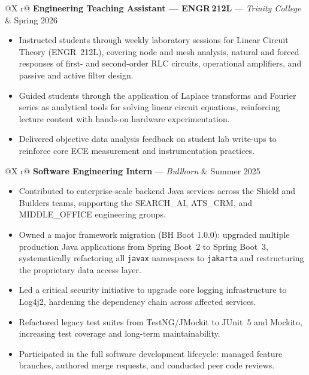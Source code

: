 \documentclass[10pt, letterpaper]{article}
\makeatletter
\newcommand{\cventry}[4]{%
  \begin{tabularx}{\linewidth}{@{}X r@{}}
    \textbf{#1} \textnormal{---} \textit{#2} & \textnormal{#4} \\
    \multicolumn{2}{@{}l@{}}{\small #3}
  \end{tabularx}\vspace{1pt}}
\makeatother
\begin{document}
\vspace{6pt}

\cventry{Engineering Teaching Assistant --- ENGR\,212L}{Trinity College}{Hartford, CT}{Spring 2026}
\begin{itemize}
  \item Instructed students through weekly laboratory sessions for Linear Circuit Theory
        (ENGR~212L), covering node and mesh analysis, natural and forced responses of first- and
        second-order RLC circuits, operational amplifiers, and passive and active filter design.
  \item Guided students through the application of Laplace transforms and Fourier series as
        analytical tools for solving linear circuit equations, reinforcing lecture content with
        hands-on hardware experimentation.
  \item Delivered objective data analysis feedback on student lab write-ups to reinforce core
        ECE measurement and instrumentation practices.
\end{itemize}

\vspace{6pt}

\cventry{Software Engineering Intern}{Bullhorn}{Boston, MA}{Summer 2025}
\begin{itemize}
  \item Contributed to enterprise-scale backend Java services across the Shield and Builders
        teams, supporting the SEARCH\_AI, ATS\_CRM, and MIDDLE\_OFFICE engineering groups.
  \item Owned a major framework migration (BH Boot 1.0.0): upgraded multiple production Java
        applications from Spring Boot~2 to Spring Boot~3, systematically refactoring all
        \texttt{javax} namespaces to \texttt{jakarta} and restructuring the proprietary data
        access layer.
  \item Led a critical security initiative to upgrade core logging infrastructure to Log4j2,
        hardening the dependency chain across affected services.
  \item Refactored legacy test suites from TestNG/JMockit to JUnit~5 and Mockito, increasing
        test coverage and long-term maintainability.
  \item Participated in the full software development lifecycle: managed feature branches,
        authored merge requests, and conducted peer code reviews.
\end{itemize}

\vspace{6pt}
\end{document}
